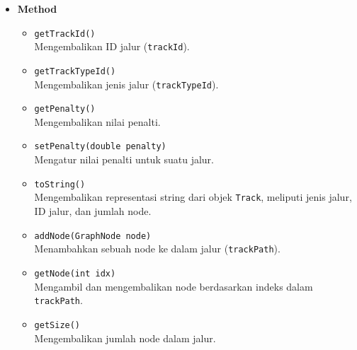 \begin{itemize}
    \item \textbf{Method}
    \begin{itemize}
        \item \texttt{getTrackId()}
        \\ Mengembalikan ID jalur (\texttt{trackId}).
        \item \texttt{getTrackTypeId()}
        \\ Mengembalikan jenis jalur (\texttt{trackTypeId}).
        \item \texttt{getPenalty()}
        \\ Mengembalikan nilai penalti.
        \item \texttt{setPenalty(double penalty)}
        \\ Mengatur nilai penalti untuk suatu jalur.
        \item \texttt{toString()}
        \\ Mengembalikan representasi string dari objek \texttt{Track}, meliputi jenis jalur, ID jalur, dan jumlah node.
        \item \texttt{addNode(GraphNode node)}
        \\ Menambahkan sebuah node ke dalam jalur (\texttt{trackPath}).
        \item \texttt{getNode(int idx)}
        \\ Mengambil dan mengembalikan node berdasarkan indeks dalam \texttt{trackPath}.
        \item \texttt{getSize()}
        \\ Mengembalikan jumlah node dalam jalur.
    \end{itemize}
\end{itemize}

